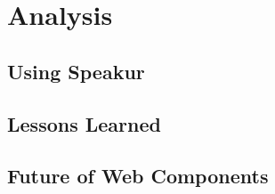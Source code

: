 \chapter{Analysis}
%


\section{Using Speakur}

\section{Lessons Learned}

\section{Future of Web Components}

